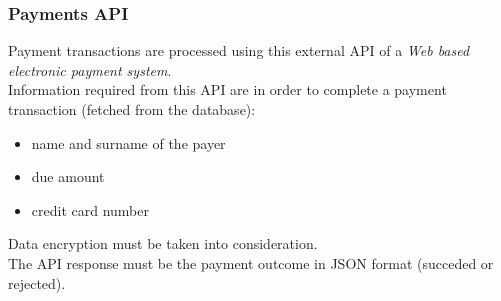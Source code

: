 \subsubsection{Payments API}
Payment transactions are processed using this external API of a \emph{Web based electronic payment system}.\\
Information required from this API are in order to complete a payment transaction (fetched from the database):
\begin{itemize}
	\item name and surname of the payer
	\item due amount
	\item credit card number
\end{itemize}
Data encryption must be taken into consideration.\\
The API response must be the payment outcome in JSON format (succeded or rejected).
